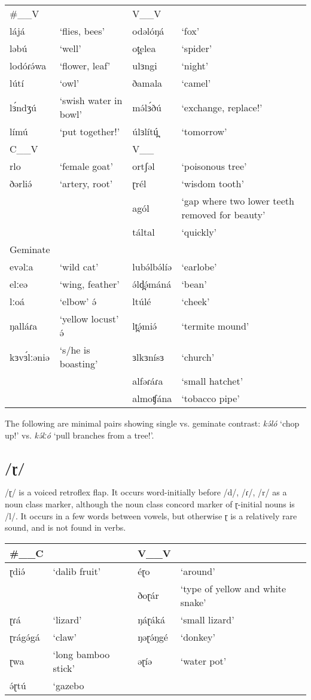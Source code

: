 \ea 	
\begin{supertabular}[t]{lp{3cm}lp{3cm}}
\#\_\_V	&&	V\_\_V		\\
lájá	&‘flies, bees’		&odəlóŋá 	&‘fox’\\
ləbú	&‘well’				&ot̪elea		&‘spider’\\
lodóɾə́wa	&‘flower, leaf’		&ulɜngi		&‘night’\\
lútí	&‘owl’				&ðamala		&‘camel’\\
lɜ́ndʒú	&‘swish water in bowl’			&mə́lɜ́ðú	&‘exchange, replace!’\\
límú	&‘put together!’		&úlɜlítú̪	&‘tomorrow’\\
\midrule
C\_\_V	&&		V\_\_	\\
\midrule
rlo		&‘female goat’		&ortʃəl	&‘poisonous tree’\\
ðərliə́	&‘artery, root’		&ɽrél	&‘wisdom tooth’\\
							&&agól	&‘gap where two lower teeth removed for beauty’\\
							&&táltal	&‘quickly’\\
\midrule
Geminate				\\
\midrule
evəlːa	&‘wild cat’		&lubə́lbə́líə	&‘earlobe’\\
elːeə	&‘wing, feather’		&ə́ld̪ə́máná	&‘bean’\\
lːoá	&‘elbow’		ə́&ltúlé	&‘cheek’\\
ŋalláɾa	&‘yellow locust’		ə́&lt̪ə́miə́	&‘termite mound’\\
kɜvɜ́lːəniə	&‘s/he is boasting’		&ɜlkɜnísɜ	&‘church’\\
						&&alfəɾáɾa	&‘small hatchet’\\
						&&almoʧána	&‘tobacco pipe’\\
\end{supertabular}\label{ex:ch2:36}
\z 

The following are minimal pairs showing single vs. geminate contrast: \textit{kə́ló} ‘chop up!’ vs. \textit{kə́lːó} ‘pull branches from a tree!’.


\subsection{/ɽ/}
/ɽ/ is a voiced retroflex flap. It occurs word-initially before /d/, /ɾ/, /r/ as a noun class marker, although the noun class concord marker of ɽ-initial nouns is /l/. It occurs in a few words between vowels, but otherwise ɽ is a relatively rare sound, and is not found in verbs. 
\ea 	
\begin{tabular}[t]{lllp{4cm}}
\#\_\_C	&&	V\_\_V		\\
\midrule
ɽdiə́		&‘dalib fruit’	&éɽo	&‘around’\\
				&&ðoɽár	&‘type of yellow and white snake’\\
ɽɾá		&‘lizard’	&ŋáɽáká	&‘small lizard’\\
ɽrágə́gá	&‘claw’		&ŋəɽə́ŋgé	&‘donkey’\\
ɽwa		&‘long bamboo stick’		&əɽíə	&‘water pot'\\
ə́ɽtú		&‘gazebo	
\end{tabular}\label{ex:ch2:37}
\z 	

